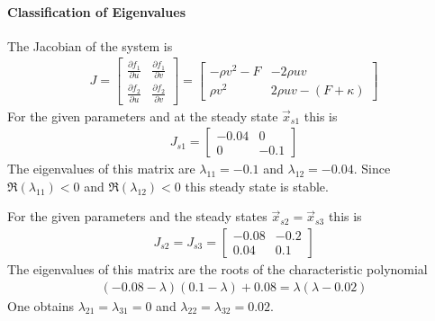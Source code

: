 \paragraph{Classification of Eigenvalues}
The Jacobian of the system is
\begin{align}
J = \begin{bmatrix}
\frac{\partial f_1}{\partial u} & \frac{\partial f_1}{\partial v} \\[0.3em]
\frac{\partial f_2}{\partial u} & \frac{\partial f_2}{\partial v}
\end{bmatrix}
=
\begin{bmatrix}
-\rho v^2 - F & -2 \rho u v \\[0.3em]
\rho v^2 & 2 \rho u v - (F + \kappa)
\end{bmatrix}
\end{align}
For the given parameters and at the steady state $\vec{x}_{s1}$ this is
\begin{align}
J_{s1} = \begin{bmatrix}
-0.04 & 0 \\
0 & -0.1
\end{bmatrix}
\end{align}
The eigenvalues of this matrix are $\lambda_{11} = -0.1$ and $\lambda_{12} = -0.04$. Since $\Re(\lambda_{11}) < 0$ and $\Re(\lambda_{12}) < 0$ this steady state is stable. \par
For the given parameters and the steady states $\vec{x}_{s2} = \vec{x}_{s3}$ this is
\begin{align}
J_{s2} = J_{s3} = 
\begin{bmatrix}
-0.08 & -0.2 \\
0.04 & 0.1
\end{bmatrix}
\end{align}
The eigenvalues of this matrix are the roots of the characteristic polynomial
\begin{align}
(-0.08-\lambda)(0.1-\lambda)+0.08=\lambda (\lambda - 0.02)
\end{align}
One obtains $\lambda_{21} = \lambda_{31} = 0$ and $\lambda_{22} = \lambda_{32} = 0.02$.
%
%
%
%
%